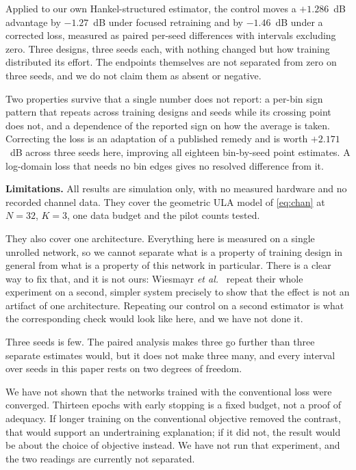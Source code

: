 \documentclass[journal]{IEEEtran}
\begin{document}
Applied to our own Hankel-structured estimator, the control moves a $+1.286$~dB
advantage by $-1.27$~dB under focused retraining and by $-1.46$~dB under a
corrected loss, measured as paired per-seed differences with intervals
excluding zero. Three designs, three seeds each, with nothing changed but how
training distributed its effort. The endpoints themselves are not separated
from zero on three seeds, and we do not claim them as absent or negative.

Two properties survive that a single number does not report: a per-bin sign
pattern that repeats across training designs and seeds while its crossing point
does not, and a dependence of the reported sign on how the average is taken.
Correcting the loss is an adaptation of a published remedy and is worth
$+2.171$~dB across three seeds here, improving all eighteen bin-by-seed point
estimates. A log-domain loss that needs no bin edges gives no resolved
difference from it.

\textbf{Limitations.} All results are simulation only, with no measured
hardware and no recorded channel data. They cover the geometric ULA model of
\eqref{eq:chan} at $N=32$, $K=3$, one data budget and the pilot counts tested.

They also cover one architecture. Everything here is measured on a single
unrolled network, so we cannot separate what is a property of training design
in general from what is a property of this network in particular. There is a
clear way to fix that, and it is not ours: Wiesmayr \emph{et
al.}~\cite{wiesmayr2023bler} repeat their whole experiment on a second, simpler
system precisely to show that the effect is not an artifact of one
architecture. Repeating our control on a second estimator is what the
corresponding check would look like here, and we have not done it.

Three seeds is few. The paired analysis makes three go further than three
separate estimates would, but it does not make three many, and every interval
over seeds in this paper rests on two degrees of freedom.

We have not shown that the networks trained with the conventional loss were
converged. Thirteen epochs with early stopping is a fixed budget, not a proof
of adequacy. If longer training on the conventional objective removed the
contrast, that would support an undertraining explanation; if it did not, the
result would be about the choice of objective instead. We have not run that
experiment, and the two readings are currently not separated.
\end{document}
